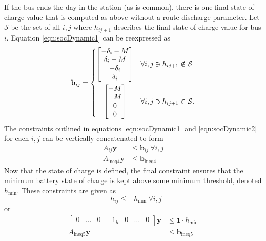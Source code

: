 If the bus ends the day in the station (as is common), there is one final state of charge value that is computed as above without a route discharge parameter. Let $\mathcal{S}$ be the set of all $i,j$ where $h_{ij+1}$ describes the final state of charge value for bus $i$. Equation \ref{eqn:socDynamic1} can be reexpressed as 
\begin{equation}\label{eqn:socDynamic2} 
	\mathbf{b}_{ij} = 
	\begin{dcases}
		\begin{bmatrix} -\delta_i - M \\
			         \delta_i - M \\
		                -\delta_i     \\
		                 \delta_i 
		\end{bmatrix} & \forall i,j \ni h_{ij+1} \notin \mathcal{S} \\
		\omit \hfil$\begin{bmatrix} - M \\
		                - M \\
		                  0 \\
		                  0 
		\end{bmatrix}$\hfil & \forall i,j \ni h_{ij+1} \in \mathcal{S}.
	\end{dcases}
\end{equation}
The constraints outlined in equations \ref{eqn:socDynamic1} and \ref{eqn:socDynamic2} for each $i,j$ can be vertically concatenated to form
\begin{equation}\label{eqn:socDynamic3} \begin{aligned}
	A_{ij}\mathbf{y} &\le \mathbf{b}_{ij} \ \forall i,j \\
	A_{\text{ineq4}}\mathbf{y} &\le \mathbf{b}_{\text{ineq4}}
\end{aligned} \end{equation}
Now that the state of charge is defined, the final constraint ensures that the minimum battery state of charge is kept above some minimum threshold, denoted $h_{\text{min}}$. These constraints are given as
\begin{equation}
	-h_{ij} \le -h_{\text{min}} \ \forall i,j
\end{equation}
or 
\begin{equation} \begin{aligned}
	\begin{bmatrix}0 & \hdots & 0 & -1_{h} & 0 & \hdots & 0\end{bmatrix} \mathbf{y} &\le \mathbf{1}\cdot h_{\text{min}}\\ 
		A_{\text{ineq5}}\mathbf{y} &\le \mathbf{b}_{\text{ineq5}}
\end{aligned} \end{equation}
